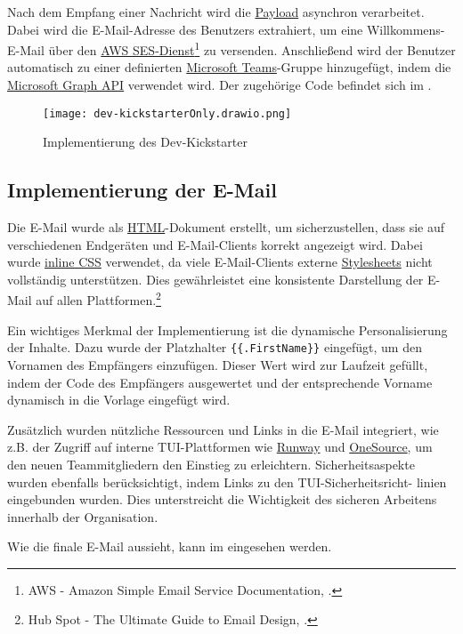 Nach dem Empfang einer Nachricht wird die \hyperlink{Payload}{\textcolor{AOBlau}{Payload}} asynchron verarbeitet. Dabei wird die E-Mail-Adresse des Benutzers extrahiert, um eine Willkommens-E-Mail über den \hyperlink{AWSSESClient}{\textcolor{AOBlau}{AWS SES-Dienst}}\footnote{AWS - Amazon Simple Email Service Documentation, \cite{aws2023ses}.} zu versenden. Anschließend wird der Benutzer automatisch zu einer definierten \hyperlink{MicrosoftTeams}{\textcolor{AOBlau}{Microsoft Teams}}-Gruppe hinzugefügt, indem die \hyperlink{MicrosoftGraphAPI}{\textcolor{AOBlau}{Microsoft Graph API}} verwendet wird.
Der zugehörige Code befindet sich im .

\begin{figure}[h]
    \centering
    \texttt{[image: dev-kickstarterOnly.drawio.png]}
    \caption{Implementierung des Dev-Kickstarter}
\end{figure}

\subsection{Implementierung der E-Mail}
\label{sec:ImplementierungGeschaeftslogik}

Die E-Mail wurde als \hyperlink{HTML}{\textcolor{AOBlau}{HTML}}-Dokument erstellt, um sicherzustellen, dass sie auf verschiedenen Endgeräten und E-Mail-Clients korrekt angezeigt wird. Dabei wurde \hyperlink{CSS}{\textcolor{AOBlau}{inline CSS}} verwendet, da viele E-Mail-Clients externe \hyperlink{CSS}{\textcolor{AOBlau}{Stylesheets}} nicht vollständig unterstützen. Dies gewährleistet eine konsistente Darstellung der E-Mail auf allen Plattformen.\footnote{Hub Spot - The Ultimate Guide to Email Design, \cite{HubSpot}.}

Ein wichtiges Merkmal der Implementierung ist die dynamische Personalisierung der Inhalte. Dazu wurde der Platzhalter \texttt{\{\{.FirstName\}\}} eingefügt, um den Vornamen des Empfängers einzufügen. Dieser Wert wird zur Laufzeit gefüllt, indem der Code des Empfängers ausgewertet und der entsprechende Vorname dynamisch in die Vorlage eingefügt wird.

Zusätzlich wurden nützliche Ressourcen und Links in die E-Mail integriert, wie z.B. der Zugriff auf interne TUI-Plattformen wie  \hyperlink{Runway}{\textcolor{AOBlau}{Runway}} und \hyperlink{OneSource}{\textcolor{AOBlau}{OneSource}}, um den neuen Teammitgliedern den Einstieg zu erleichtern. Sicherheitsaspekte wurden ebenfalls berücksichtigt, indem Links zu den TUI-Sicherheitsricht-
linien eingebunden wurden. Dies unterstreicht die Wichtigkeit des sicheren Arbeitens innerhalb der Organisation.

Wie die finale E-Mail aussieht, kann im  eingesehen werden.
